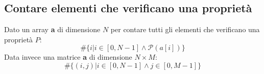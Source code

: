 \subsection{Contare elementi che verificano una proprietà}
Dato un array \textbf{a} di dimensione $N$ per contare tutti gli elementi che verificano una proprietà $P$:
\begin{equation}
	\#\{i \lvert i\in [0, N-1] \land \mathcal{P}(a[i])\}
\end{equation}
Data invece una matrice \textbf{a} di dimensione $N \times M$:
\begin{equation}
	\#\{(i,j) \lvert i \in [0, N-1] \land j \in [0, M-1]\}
\end{equation}